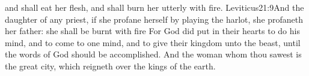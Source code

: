  and shall eat her flesh, and shall burn her utterly with fire.
		{Leviticus}{21:9}{And the daughter of any priest, if she profane herself by playing the harlot, she profaneth her father: she shall be burnt with fire}
For God did put in their hearts to do his mind, and to come to one mind, and to give their kingdom unto the beast, until the words of God should be accomplished. 
And the woman whom thou sawest is the great city, which reigneth over the kings of the earth.
